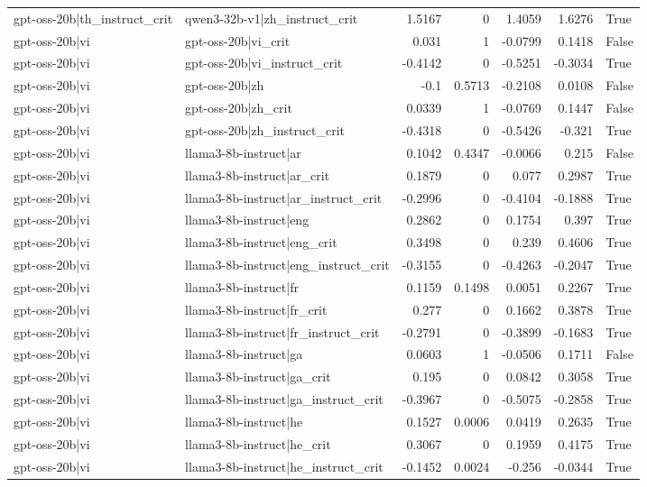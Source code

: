 \begin{table}
\begin{tabular}{l l r r r r l}
gpt-oss-20b|th_instruct_crit & qwen3-32b-v1|zh_instruct_crit & 1.5167 & 0 & 1.4059 & 1.6276 & True \\
gpt-oss-20b|vi & gpt-oss-20b|vi_crit & 0.031 & 1 & -0.0799 & 0.1418 & False \\
gpt-oss-20b|vi & gpt-oss-20b|vi_instruct_crit & -0.4142 & 0 & -0.5251 & -0.3034 & True \\
gpt-oss-20b|vi & gpt-oss-20b|zh & -0.1 & 0.5713 & -0.2108 & 0.0108 & False \\
gpt-oss-20b|vi & gpt-oss-20b|zh_crit & 0.0339 & 1 & -0.0769 & 0.1447 & False \\
gpt-oss-20b|vi & gpt-oss-20b|zh_instruct_crit & -0.4318 & 0 & -0.5426 & -0.321 & True \\
gpt-oss-20b|vi & llama3-8b-instruct|ar & 0.1042 & 0.4347 & -0.0066 & 0.215 & False \\
gpt-oss-20b|vi & llama3-8b-instruct|ar_crit & 0.1879 & 0 & 0.077 & 0.2987 & True \\
gpt-oss-20b|vi & llama3-8b-instruct|ar_instruct_crit & -0.2996 & 0 & -0.4104 & -0.1888 & True \\
gpt-oss-20b|vi & llama3-8b-instruct|eng & 0.2862 & 0 & 0.1754 & 0.397 & True \\
gpt-oss-20b|vi & llama3-8b-instruct|eng_crit & 0.3498 & 0 & 0.239 & 0.4606 & True \\
gpt-oss-20b|vi & llama3-8b-instruct|eng_instruct_crit & -0.3155 & 0 & -0.4263 & -0.2047 & True \\
gpt-oss-20b|vi & llama3-8b-instruct|fr & 0.1159 & 0.1498 & 0.0051 & 0.2267 & True \\
gpt-oss-20b|vi & llama3-8b-instruct|fr_crit & 0.277 & 0 & 0.1662 & 0.3878 & True \\
gpt-oss-20b|vi & llama3-8b-instruct|fr_instruct_crit & -0.2791 & 0 & -0.3899 & -0.1683 & True \\
gpt-oss-20b|vi & llama3-8b-instruct|ga & 0.0603 & 1 & -0.0506 & 0.1711 & False \\
gpt-oss-20b|vi & llama3-8b-instruct|ga_crit & 0.195 & 0 & 0.0842 & 0.3058 & True \\
gpt-oss-20b|vi & llama3-8b-instruct|ga_instruct_crit & -0.3967 & 0 & -0.5075 & -0.2858 & True \\
gpt-oss-20b|vi & llama3-8b-instruct|he & 0.1527 & 0.0006 & 0.0419 & 0.2635 & True \\
gpt-oss-20b|vi & llama3-8b-instruct|he_crit & 0.3067 & 0 & 0.1959 & 0.4175 & True \\
gpt-oss-20b|vi & llama3-8b-instruct|he_instruct_crit & -0.1452 & 0.0024 & -0.256 & -0.0344 & True \\

\end{tabular}
\end{table}

